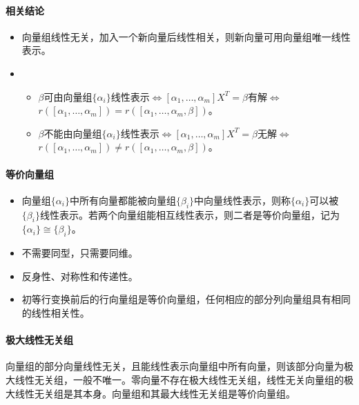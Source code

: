 \documentclass[
12pt, %
a4paper, 
oneside, %
headinclude,footinclude, %
]{scrartcl}
\begin{document}
\paragraph{相关结论}
\begin{itemize}
\item 向量组线性无关，加入一个新向量后线性相关，则新向量可用向量组唯一线性表示。
\item 
\begin{itemize}
\item $ \beta $可由向量组$ \{\alpha_i\} $线性表示$ \Leftrightarrow $$ [\alpha_1, \dots, \alpha_m]X^T = \beta $有解$ \Leftrightarrow $$ r([\alpha_1, \dots, \alpha_m]) = r([\alpha_1, \dots, \alpha_m, \beta]) $。
\item $ \beta $不能由向量组$ \{\alpha_i\} $线性表示$ \Leftrightarrow $$ [\alpha_1, \dots, \alpha_m]X^T = \beta $无解$ \Leftrightarrow $$ r([\alpha_1, \dots, \alpha_m]) \neq r([\alpha_1, \dots, \alpha_m, \beta]) $。
\end{itemize}
\end{itemize}
\paragraph{等价向量组}
\begin{itemize}
\item 向量组$ \{\alpha_i\} $中所有向量都能被向量组$ \{\beta_i\} $中向量线性表示，则称$ \{\alpha_i\} $可以被$ \{\beta_i\} $线性表示。若两个向量组能相互线性表示，则二者是等价向量组，记为$ \{\alpha_i\} \cong \{\beta_i\} $。
\item 不需要同型，只需要同维。
\item 反身性、对称性和传递性。
\item 初等行变换前后的行向量组是等价向量组，任何相应的部分列向量组具有相同的线性相关性。
\end{itemize}
\paragraph{极大线性无关组}
向量组的部分向量线性无关，且能线性表示向量组中所有向量，则该部分向量为极大线性无关组，一般不唯一。零向量不存在极大线性无关组，线性无关向量组的极大线性无关组是其本身。向量组和其最大线性无关组是等价向量组。
\end{document}

